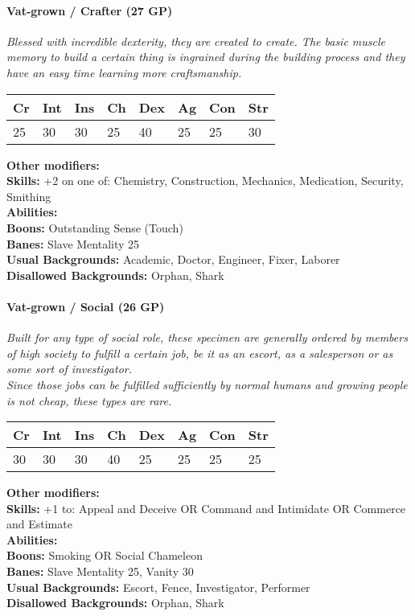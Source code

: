 \hrulefill
\paragraph*{Vat-grown / Crafter (27 GP)}
\textit{Blessed with incredible dexterity, they are created to create. The basic muscle memory to build a certain thing is ingrained during the building process and they have an easy time learning more craftsmanship.}\par
\begin{tabular}{|l|l|l|l|l|l|l|l|}
	\hline
	Cr & Int & Ins & Ch & Dex & Ag & Con & Str \\ \hline
	25 & 30 & 30 & 25 & 40 & 25 & 25 & 30 \\ \hline
\end{tabular}\par
\noindent\textbf{Other modifiers:} \\
\textbf{Skills:} +2 on one of: Chemistry, Construction, Mechanics, Medication, Security, Smithing\\
\textbf{Abilities:} \\
\textbf{Boons:} Outstanding Sense (Touch)\\
\textbf{Banes:} Slave Mentality 25\\
\textbf{Usual Backgrounds:} Academic, Doctor, Engineer, Fixer, Laborer\\
\textbf{Disallowed Backgrounds:} Orphan, Shark

\hrulefill
\paragraph*{Vat-grown / Social (26 GP)}
\textit{Built for any type of social role, these specimen are generally ordered by members of high society to fulfill a certain job, be it as an escort, as a salesperson or as some sort of investigator.\\
	Since those jobs can be fulfilled sufficiently by normal humans and growing people is not cheap, these types are rare.}\par
\begin{tabular}{|l|l|l|l|l|l|l|l|}
	\hline
	Cr & Int & Ins & Ch & Dex & Ag & Con & Str \\ \hline
	30 & 30 & 30 & 40 & 25 & 25 & 25 & 25 \\ \hline
\end{tabular}\par
\noindent\textbf{Other modifiers:} \\
\textbf{Skills:} +1 to: Appeal and Deceive OR Command and Intimidate OR Commerce and Estimate\\
\textbf{Abilities:} \\
\textbf{Boons:} Smoking OR Social Chameleon\\
\textbf{Banes:} Slave Mentality 25,
Vanity 30\\
\textbf{Usual Backgrounds:} Escort, Fence, Investigator, Performer\\
\textbf{Disallowed Backgrounds:} Orphan, Shark

